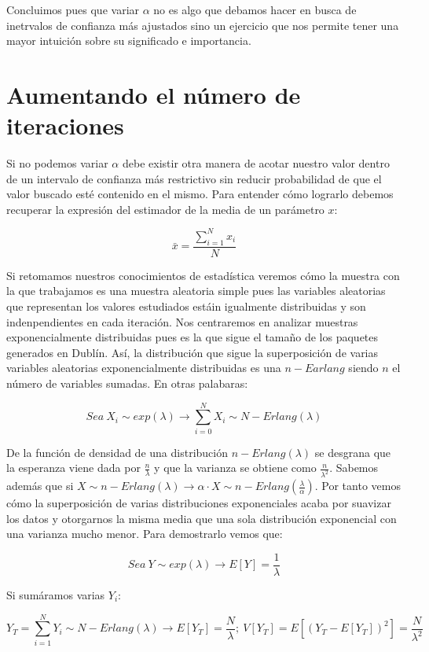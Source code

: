 \documentclass{article}[10pt]
\begin{document}
		Concluimos pues que variar $\alpha$ no es algo que debamos hacer en busca de inetrvalos de confianza más ajustados sino un ejercicio que nos permite tener una mayor intuición sobre su significado e importancia.

	\section{Aumentando el número de iteraciones}
		Si no podemos variar $\alpha$ debe existir otra manera de acotar nuestro valor dentro de un intervalo de confianza más restrictivo sin reducir probabilidad de que el valor buscado esté contenido en el mismo. Para entender cómo lograrlo debemos recuperar la expresión del estimador de la media de un parámetro $x$:

		$$\bar{x} = \frac{\sum_{i = 1}^N x_i}{N}$$

		Si retomamos nuestros conocimientos de estadística veremos cómo la muestra con la que trabajamos es una muestra aleatoria simple pues las variables aleatorias que representan los valores estudiados estáin igualmente distribuidas y son indenpendientes en cada iteración. Nos centraremos en analizar muestras exponencialmente distribuidas pues es la que sigue el tamaño de los paquetes generados en Dublín. Así, la distribución que sigue la superposición de varias variables aleatorias exponencialmente distribuidas es una $n-Earlang$ siendo $n$ el número de variables sumadas. En otras palabaras:

		$$Sea\ X_i \sim exp(\lambda) \rightarrow \sum_{i = 0}^N X_i \sim N-Erlang(\lambda)$$

		De la función de densidad de una distribución $n-Erlang(\lambda)$ se desgrana que la esperanza viene dada por $\frac{n}{\lambda}$ y que la varianza se obtiene como $\frac{n}{\lambda^2}$. Sabemos además que si $X \sim n-Erlang(\lambda) \rightarrow \alpha \cdot X \sim n-Erlang(\frac{\lambda}{\alpha})$. Por tanto vemos cómo la superposición de varias distribuciones exponenciales acaba por suavizar los datos y otorgarnos la misma media que una sola distribución exponencial con una varianza mucho menor. Para demostrarlo vemos que:

		$$Sea\ Y \sim exp(\lambda) \rightarrow E[Y] = \frac{1}{\lambda}$$

		Si sumáramos varias $Y_i$:

		$$Y_T = \sum_{i = 1}^N Y_i \sim N-Erlang(\lambda) \rightarrow E[Y_T] = \frac{N}{\lambda};\ V[Y_T] = E[(Y_T - E[Y_T])^2] = \frac{N}{\lambda^2}$$
\end{document}
